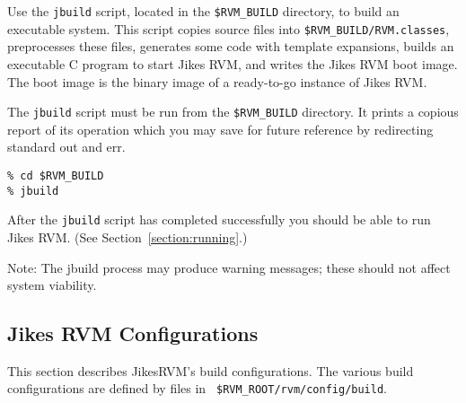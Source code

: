 \begin{enumerate}
Use the {\tt jbuild} script, located in the {\tt \$RVM\_BUILD} directory,
to build an executable system.  This script copies source files into
{\tt \$RVM\_BUILD/RVM.classes}, preprocesses these files, generates
some code with template expansions, builds an executable C program to
start Jikes RVM, and writes the Jikes RVM boot image.  The boot
image is the binary image of a ready-to-go instance of Jikes RVM.

The {\tt jbuild} script must be run from the {\tt \$RVM\_BUILD}
directory. It prints a copious report of its operation which you may
save for future reference by redirecting standard out and err.

\begin{verbatim}
% cd $RVM_BUILD
% jbuild
\end{verbatim}


After the {\tt jbuild} script has completed successfully you should be able 
to run Jikes RVM.  (See Section~\ref{section:running}.)

Note: The jbuild process may produce warning messages; these should not
affect system viability.

\end{enumerate}

\AIXPPCJikesTMFooter

\subsection{Jikes RVM Configurations}\label{configs}

This section describes Jikes\trademark RVM's build configurations.
The various build configurations are defined by files in {\tt
\$RVM\_ROOT/rvm/config/build}.

